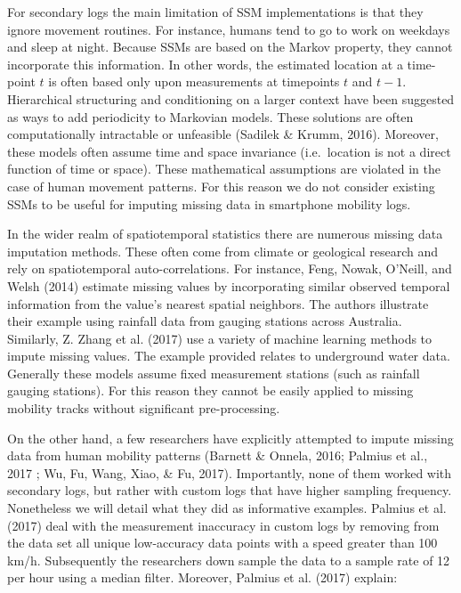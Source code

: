 \documentclass[man]{apa6}
\theoremstyle{definition}
\theoremstyle{definition}
\theoremstyle{definition}
\theoremstyle{remark}
\begin{document}
For secondary logs the main limitation of SSM implementations is that
they ignore movement routines. For instance, humans tend to go to work
on weekdays and sleep at night. Because SSMs are based on the Markov
property, they cannot incorporate this information. In other words, the
estimated location at a time-point \(t\) is often based only upon
measurements at timepoints \(t\) and \({t-1}\). Hierarchical structuring
and conditioning on a larger context have been suggested as ways to add
periodicity to Markovian models. These solutions are often
computationally intractable or unfeasible (Sadilek \& Krumm, 2016).
Moreover, these models often assume time and space invariance
(i.e.~location is not a direct function of time or space). These
mathematical assumptions are violated in the case of human movement
patterns. For this reason we do not consider existing SSMs to be useful
for imputing missing data in smartphone mobility logs.

In the wider realm of spatiotemporal statistics there are numerous
missing data imputation methods. These often come from climate or
geological research and rely on spatiotemporal auto-correlations. For
instance, Feng, Nowak, O'Neill, and Welsh (2014) estimate missing values
by incorporating similar observed temporal information from the value's
nearest spatial neighbors. The authors illustrate their example using
rainfall data from gauging stations across Australia. Similarly, Z.
Zhang et al. (2017) use a variety of machine learning methods to impute
missing values. The example provided relates to underground water data.
Generally these models assume fixed measurement stations (such as
rainfall gauging stations). For this reason they cannot be easily
applied to missing mobility tracks without significant pre-processing.

On the other hand, a few researchers have explicitly attempted to impute
missing data from human mobility patterns (Barnett \& Onnela, 2016;
Palmius et al., 2017 ; Wu, Fu, Wang, Xiao, \& Fu, 2017). Importantly,
none of them worked with secondary logs, but rather with custom logs
that have higher sampling frequency. Nonetheless we will detail what
they did as informative examples. Palmius et al. (2017) deal with the
measurement inaccuracy in custom logs by removing from the data set all
unique low-accuracy data points with a speed greater than 100 km/h.
Subsequently the researchers down sample the data to a sample rate of 12
per hour using a median filter. Moreover, Palmius et al. (2017) explain:
\end{document}
